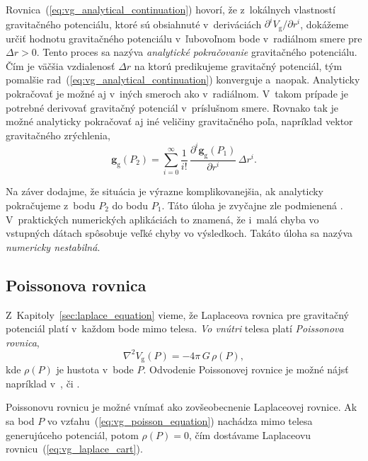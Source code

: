 \documentclass[a4paper, 12pt]{book}
\newcommand{\gidx}{\mathrm g}
\let\vec\mathbf
\begin{document}
Rovnica~(\ref{eq:vg_analytical_continuation}) hovorí, že z~lokálnych vlastností 
gravitačného potenciálu, ktoré sú obsiahnuté v~deriváciách $\partial^i V_\gidx 
\slash \partial r^i$, dokážeme určiť hodnotu gravitačného potenciálu 
v~ľubovoľnom bode v~radiálnom smere pre $\Delta r > 0$.  Tento proces sa nazýva 
\emph{analytické pokračovanie} gravitačného potenciálu.  Čím je väčšia 
vzdialenosť $\Delta r$ na ktorú predikujeme gravitačný potenciál, tým pomalšie 
rad~(\ref{eq:vg_analytical_continuation}) konverguje a~naopak.  Analyticky 
pokračovať je možné aj v~iných smeroch ako v~radiálnom.  V~takom prípade je 
potrebné derivovať gravitačný potenciál v~príslušnom smere.  Rovnako tak je 
možné analyticky pokračovať aj iné veličiny gravitačného poľa, napríklad vektor 
gravitačného zrýchlenia,
%
\begin{equation}
\vec g_\gidx(P_2) = \sum_{i = 0}^{\infty} \frac{1}{i!} \, \frac{\partial^i \vec 
g_\gidx(P_1)}{\partial r^i} \, \Delta r^i{.}
\end{equation}

Na záver dodajme, že situácia je výrazne komplikovanejšia, ak analyticky 
pokračujeme z~bodu $P_2$ do bodu $P_1$.  Táto úloha je zvyčajne zle podmienená 
\citep{SansoGeodeticBoundaryValueProblem}.  V~praktických numerických 
aplikáciách to znamená, že i~malá chyba vo vstupných dátach spôsobuje veľké 
chyby vo výsledkoch.  Takáto úloha sa nazýva \emph{numericky nestabilná}.  






\subsection{Poissonova rovnica}
\label{sec:poisson_equation}

Z~Kapitoly~\ref{sec:laplace_equation} vieme, že Laplaceova rovnica pre 
gravitačný potenciál platí v~každom bode mimo telesa.  \emph{Vo vnútri} telesa 
platí \emph{Poissonova rovnica},
%
\begin{equation}
\label{eq:vg_poisson_equation}
\nabla^2 V_\gidx(P) = -4 \pi \, G \, \rho(P){,}
\end{equation}
%
kde $\rho(P)$ je hustota v~bode $P$.  Odvodenie Poissonovej rovnice je možné 
nájsť napríklad v~\cite{MacMillan1930}, \cite{Kellogg1967} či 
\cite{SansoGeoidDetermination}.

Poissonovu rovnicu je možné vnímať ako zovšeobecnenie Laplaceovej rovnice.  Ak 
sa bod $P$ vo vzťahu~(\ref{eq:vg_poisson_equation}) nachádza mimo telesa 
generujúceho potenciál, potom $\rho(P) = 0$, čím dostávame Laplaceovu 
rovnicu~(\ref{eq:vg_laplace_cart}).
\end{document}
